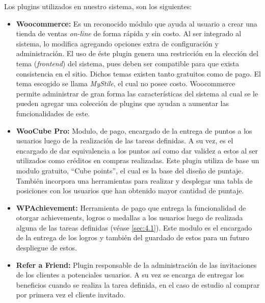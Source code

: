 Los plugins utilizados en nuestro sistema, son los siguientes:

\begin{itemize}

    \item {\bf Woocommerce:}
        Es un reconocido módulo que ayuda al usuario a crear una tienda de
        ventas \emph{on-line} de forma rápida y sin costo.
        Al ser integrado al sistema, lo modifica agregando opciones
        extra de configuración y administración.
        El uso de éste plugin genera una restricción en la elección
        del tema (\emph{frontend}) del sistema, pues deben ser compatible
        para que exista consistencia en el sitio.
        Dichos temas existen tanto gratuitos como de pago.
        El tema escogido se llama \emph{MyStile}, el cual no posee costo.
        Woocommerce permite administrar de gran forma las características del
        sistema al cual se le pueden agregar una colección de plugins que ayudan a
        aumentar las funcionalidades de este.

    \item {\bf WooCube Pro:}
        Modulo, de pago, encargado de la entrega de puntos a los usuarios luego de
        la realización de las tareas definidas.
        A su vez, es el encargado de dar equivalencia a los puntos así como dar
        validez a estos al ser utilizados como créditos en compras realizadas.
        Este plugin utiliza de base un modulo gratuito, ``Cube points'',
        el cual es la base del diseño de puntaje.
        También incorpora una herramientas para realizar y desplegar una tabla
        de posiciones con los usuarios que han obtenido mayor cantidad de puntaje.

    \item {\bf WPAchievement:}
        Herramienta de pago que entrega la funcionalidad de otorgar achievements,
        logros o medallas a los usuarios luego de realizada alguna de las tareas
        definidas (véase \ref{sec:4.1}).
        Este modulo es el encargado de la entrega de los logros y también del
        guardado de estos para un futuro despliegue de estos.


    \item {\bf Refer a Friend:}
        Plugin responsable de la administración de las invitaciones de los
        clientes a potenciales usuarios.
        A su vez se encarga de entregar los beneficios cuando se realiza la tarea
        definida, en el caso de estudio al comprar por primera vez el cliente
        invitado.


\end{itemize}

